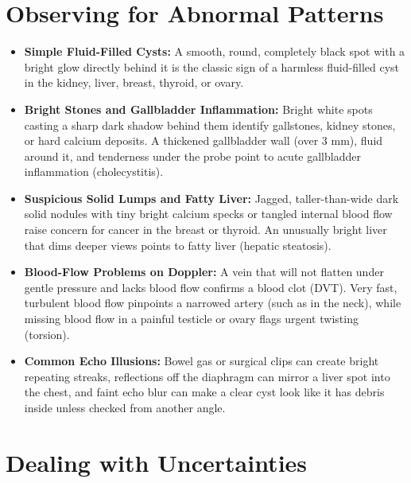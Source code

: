 \section{Observing for Abnormal Patterns}

\begin{itemize}
    \item \textbf{Simple Fluid-Filled Cysts:} A smooth, round, completely black spot with a bright glow directly behind it is the classic sign of a harmless fluid-filled cyst in the kidney, liver, breast, thyroid, or ovary.
    \item \textbf{Bright Stones and Gallbladder Inflammation:} Bright white spots casting a sharp dark shadow behind them identify gallstones, kidney stones, or hard calcium deposits. A thickened gallbladder wall (over 3 mm), fluid around it, and tenderness under the probe point to acute gallbladder inflammation (cholecystitis).
    \item \textbf{Suspicious Solid Lumps and Fatty Liver:} Jagged, taller-than-wide dark solid nodules with tiny bright calcium specks or tangled internal blood flow raise concern for cancer in the breast or thyroid. An unusually bright liver that dims deeper views points to fatty liver (hepatic steatosis).
    \item \textbf{Blood-Flow Problems on Doppler:} A vein that will not flatten under gentle pressure and lacks blood flow confirms a blood clot (DVT). Very fast, turbulent blood flow pinpoints a narrowed artery (such as in the neck), while missing blood flow in a painful testicle or ovary flags urgent twisting (torsion).
    \item \textbf{Common Echo Illusions:} Bowel gas or surgical clips can create bright repeating streaks, reflections off the diaphragm can mirror a liver spot into the chest, and faint echo blur can make a clear cyst look like it has debris inside unless checked from another angle.
\end{itemize}

\section{Dealing with Uncertainties}

